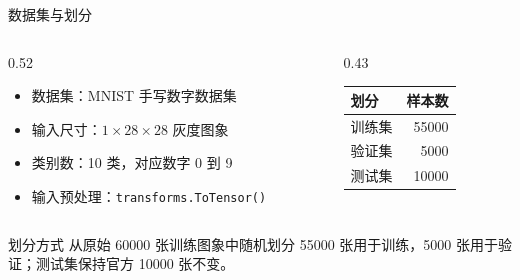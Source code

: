 \documentclass[aspectratio=169,10pt]{ctexbeamer}
\begin{document}
\begin{frame}{数据集与划分}
	\begin{columns}[T,onlytextwidth]
		\begin{column}{0.52\textwidth}
			\begin{itemize}
				\item 数据集：MNIST 手写数字数据集
				\item 输入尺寸：$1\times 28\times 28$ 灰度图象
				\item 类别数：10 类，对应数字 0 到 9
				\item 输入预处理：\texttt{transforms.ToTensor()}
			\end{itemize}
		\end{column}
		\begin{column}{0.43\textwidth}
			\begin{table}
				\centering
				\begin{tabular}{l r}
					\toprule
					划分 & 样本数 \\
					\midrule
					训练集 & 55000 \\
					验证集 & 5000 \\
					测试集 & 10000 \\
					\bottomrule
				\end{tabular}
			\end{table}
		\end{column}
	\end{columns}

	\vspace{0.2cm}
	\begin{block}{划分方式}
		从原始 60000 张训练图象中随机划分 55000 张用于训练，5000 张用于验证；测试集保持官方 10000 张不变。
	\end{block}
\end{frame}
\end{document}
